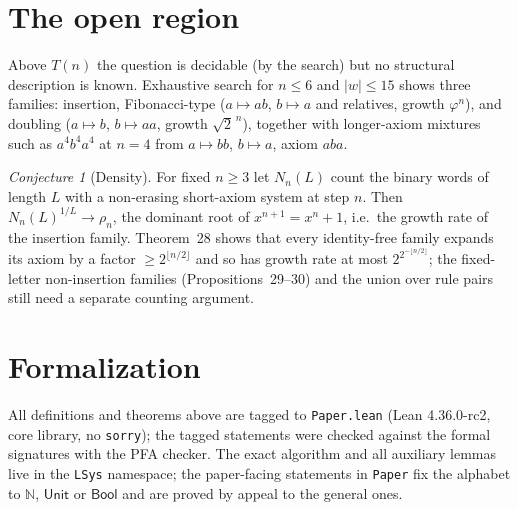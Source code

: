 \documentclass[11pt]{article}
\theoremstyle{definition}
\theoremstyle{remark}
\newtheorem*{conjecture}{Conjecture}
\newcommand{\N}{\mathbb{N}}
\begin{document}
\section{The open region}

Above $T(n)$ the question is decidable (by the search) but no structural description is known.
Exhaustive search for $n\le6$ and $|w|\le15$ shows three families: insertion, Fibonacci-type
($a\mapsto ab$, $b\mapsto a$ and relatives, growth $\varphi^n$), and doubling
($a\mapsto b$, $b\mapsto aa$, growth $\sqrt2^{\,n}$), together with longer-axiom mixtures such as
$a^4b^4a^4$ at $n=4$ from $a\mapsto bb$, $b\mapsto a$, axiom $aba$.

\begin{conjecture}[Density]
For fixed $n\ge3$ let $N_n(L)$ count the binary words of length $L$ with a non-erasing
short-axiom system at step $n$. Then $N_n(L)^{1/L}\to\rho_n$, the dominant root of
$x^{n+1}=x^n+1$, i.e.\ the growth rate of the insertion family. Theorem~28 shows that every
identity-free family expands its axiom by a factor $\ge2^{\lfloor n/2\rfloor}$ and so has growth
rate at most $2^{2^{-\lfloor n/2\rfloor}}$; the fixed-letter non-insertion families
(Propositions~29--30) and the union over rule pairs still need a separate counting argument.
\end{conjecture}

\section*{Formalization}
All definitions and theorems above are tagged to \texttt{Paper.lean} (Lean 4.36.0-rc2, core library,
no \texttt{sorry}); the tagged statements were checked against the formal signatures with the
PFA checker. The exact algorithm and all auxiliary lemmas live in the \texttt{LSys} namespace;
the paper-facing statements in \texttt{Paper} fix the alphabet to $\N$, $\mathsf{Unit}$ or
$\mathsf{Bool}$ and are proved by appeal to the general ones.
\end{document}
